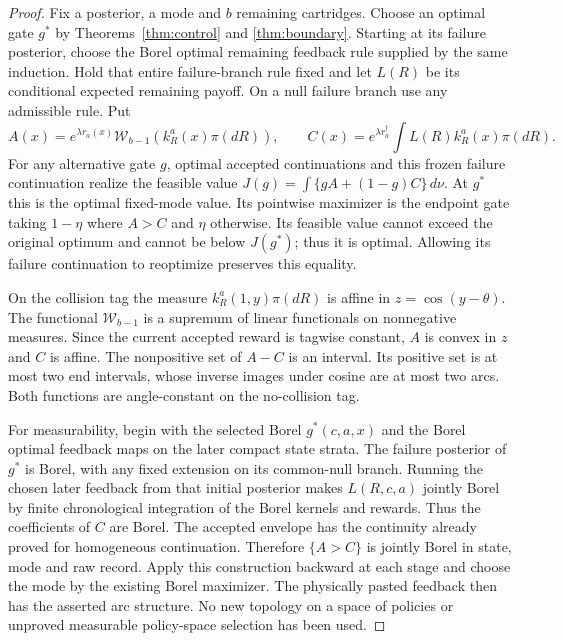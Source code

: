 \begin{proof}
Fix a posterior, a mode and $b$ remaining cartridges. Choose an optimal gate
$g^*$ by Theorems~\ref{thm:control} and \ref{thm:boundary}. Starting at its
failure posterior, choose the Borel optimal remaining feedback rule supplied
by the same induction. Hold that entire failure-branch rule fixed and let
$L(R)$ be its conditional expected remaining payoff. On a null failure
branch use any admissible rule. Put
\[
 A(x)=e^{\lambda r_a(x)}\mathcal W_{b-1}(k_R^a(x)\pi(dR)),\qquad
 C(x)=e^{\lambda r_a^\dagger}\int L(R)k_R^a(x)\pi(dR).
\]
For any alternative gate $g$, optimal accepted continuations and this frozen
failure continuation realize the feasible value
$J(g)=\int\{gA+(1-g)C\}\,d\nu$. At $g^*$ this is the optimal fixed-mode
value. Its pointwise maximizer is the endpoint gate taking $1-\eta$
where $A>C$ and $\eta$ otherwise. Its feasible value cannot exceed the
original optimum and cannot be below $J(g^*)$; thus it is optimal. Allowing
its failure continuation to reoptimize preserves this equality.

On the collision tag the measure $k_R^a(1,y)\pi(dR)$ is affine in
$z=\cos(y-\theta)$. The functional $\mathcal W_{b-1}$ is a supremum of
linear functionals on nonnegative measures. Since the current accepted
reward is tagwise constant, $A$ is convex in $z$ and $C$ is affine. The
nonpositive set of $A-C$ is an interval. Its positive set is at most two
end intervals, whose inverse images under cosine are at most two arcs.
Both functions are angle-constant on the no-collision tag.

For measurability, begin with the selected Borel $g^*(c,a,x)$ and the Borel
optimal feedback maps on the later compact state strata. The failure
posterior of $g^*$ is Borel, with any fixed extension on its common-null
branch. Running the chosen later feedback from that initial posterior
makes $L(R,c,a)$ jointly Borel by finite chronological integration of the
Borel kernels and rewards. Thus the coefficients of $C$ are Borel.
The accepted envelope has the continuity already proved for homogeneous
continuation. Therefore $\{A>C\}$ is jointly Borel in state, mode and raw
record. Apply this construction backward at each stage and choose the
mode by the existing Borel maximizer. The physically pasted feedback then
has the asserted arc structure. No new topology on a space of policies or
unproved measurable policy-space selection has been used.
\end{proof}
